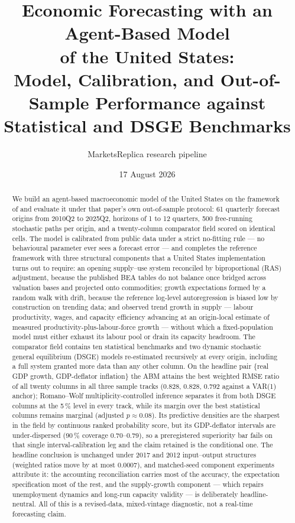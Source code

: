 \documentclass[11pt,a4paper]{article}
\title{\bfseries Economic Forecasting with an Agent-Based Model\\ of the United States:\\
\large Model, Calibration, and Out-of-Sample Performance against\\ Statistical and DSGE Benchmarks}
\author{MarketsReplica research pipeline}
\date{17 August 2026}
\begin{document}
\maketitle

\begin{abstract}
\noindent
We build an agent-based macroeconomic model of the United States on the framework of
\citet{poledna2023} and evaluate it under that paper's own out-of-sample protocol: 61 quarterly
forecast origins from 2010Q2 to 2025Q2, horizons of 1 to 12 quarters, 500 free-running stochastic
paths per origin, and a twenty-column comparator field scored on identical cells. The model is
calibrated from public data under a strict no-fitting rule --- no behavioural parameter ever sees
a forecast error --- and completes the reference framework with three structural components that a
United States implementation turns out to require: an opening supply--use system reconciled by
biproportional (RAS) adjustment, because the published BEA tables do not balance once bridged
across valuation bases and projected onto commodities; growth expectations formed by a random walk
with drift, because the reference log-level autoregression is biased low by construction on
trending data; and observed trend growth in supply --- labour productivity, wages, and capacity
efficiency advancing at an origin-local estimate of measured productivity-plus-labour-force
growth --- without which a fixed-population model must either exhaust its labour pool or drain its
capacity headroom. The comparator field contains ten statistical benchmarks and two dynamic
stochastic general equilibrium (DSGE) models re-estimated recursively at every origin, including a
full \citet{smetswouters2007} system granted more data than any other column. On the headline pair
\{real GDP growth, GDP-deflator inflation\} the ABM attains the best weighted RMSE ratio of all
twenty columns in all three sample tracks (0.828, 0.828, 0.792 against a VAR(1) anchor);
Romano--Wolf multiplicity-controlled inference separates it from both DSGE columns at the 5\,\%
level in every track, while its margin over the best statistical columns remains marginal
(adjusted $p \approx 0.08$). Its predictive densities are the sharpest in the field by continuous
ranked probability score, but its GDP-deflator intervals are under-dispersed (90\,\% coverage
0.70--0.79), so a preregistered superiority bar fails on that single interval-calibration leg and
the claim retained is the conditional one. The headline conclusion is unchanged under 2017 and
2012 input--output structures (weighted ratios move by at most 0.0007), and matched-seed component
experiments attribute it: the accounting reconciliation carries most of the accuracy, the
expectation specification most of the rest, and the supply-growth component --- which repairs
unemployment dynamics and long-run capacity validity --- is deliberately headline-neutral. All of
this is a revised-data, mixed-vintage diagnostic, not a real-time forecasting claim.
\end{abstract}
\end{document}
